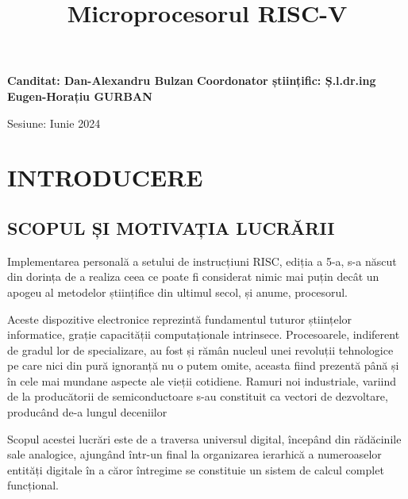 \documentclass[12pt]{article}
\begin{document}
\begin{titlepage}

\fontsize{20pt}{18pt}\selectfont
\title{\textbf{Microprocesorul RISC-V}}
\date{}
\maketitle

\vspace*{150mm}


\begingroup
    \fontsize{14pt}{12pt}\selectfont
	\textbf{Canditat: Dan-Alexandru Bulzan}
	\bigbreak
	\textbf{Coordonator științific: Ș.l.dr.ing Eugen-Horațiu GURBAN}
\endgroup


\vspace*{\fill}
\begin{center}
\fontsize{14pt}{12pt}\selectfont
Sesiune: Iunie 2024
\end{center}
\end{titlepage}


\newpage
\section{\centering INTRODUCERE}
\bigbreak
\subsection{SCOPUL ȘI MOTIVAȚIA LUCRĂRII}

Implementarea personală a setului de instrucțiuni RISC, ediția a 5-a, s-a născut din dorința de a realiza ceea ce poate fi considerat nimic mai puțin decât un apogeu al metodelor științifice din ultimul secol, și anume, procesorul.

Aceste dispozitive electronice reprezintă fundamentul tuturor științelor informatice, grație capacității computaționale intrinsece. Procesoarele, indiferent de gradul lor de specializare, au fost și rămân nucleul unei revoluții tehnologice pe care nici din pură ignoranță nu o putem omite, aceasta fiind prezentă până și în cele mai mundane aspecte ale vieții cotidiene. Ramuri noi industriale, variind de la producătorii de semiconductoare  s-au constituit ca vectori de dezvoltare, producând de-a lungul deceniilor 

Scopul acestei lucrări este de a traversa universul digital, începând din rădăcinile sale analogice, ajungând într-un final la organizarea ierarhică a numeroaselor entități digitale în a căror întregime se constituie un sistem de calcul complet funcțional.
\end{document}
